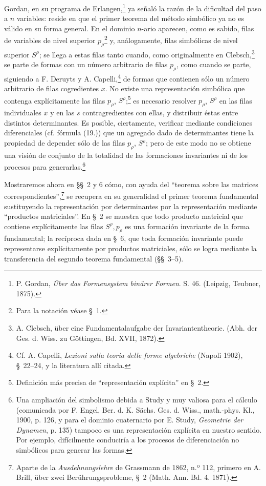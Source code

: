 \documentclass[11pt]{article}
\begin{document}
Gordan, en su programa de Erlangen,\footnote{P. Gordan, \emph{Über das Formensystem binärer Formen}. S. 46. (Leipzig, Teubner, 1875).} ya señaló la razón de la dificultad del paso a $n$ variables: reside en que el primer teorema del método simbólico ya no es válido en su forma general. En el dominio $n$-ario aparecen, como es sabido, filas de variables de nivel superior $p_\rho$\footnote{Para la notación véase \S\ 1.} y, análogamente, filas simbólicas de nivel superior $S^\rho$; se llega a estas filas tanto cuando, como originalmente en Clebsch,\footnote{A. Clebsch, über eine Fundamentalaufgabe der Invariantentheorie. (Abh. der Ges. d. Wiss. zu Göttingen, Bd. XVII, 1872).} se parte de formas con un número arbitrario de filas $p_\rho$, como cuando se parte, siguiendo a F. Deruyts y A. Capelli,\footnote{Cf. A. Capelli, \emph{Lezioni sulla teoria delle forme algebriche} (Napoli 1902), \S\ 22--24, y la literatura allí citada.} de formas que contienen sólo un número arbitrario de filas cogredientes $x$. No existe una representación simbólica que contenga explícitamente las filas $p_\rho$, $S^\rho$;\footnote{Definición más precisa de ``representación explícita'' en \S\ 2.} es necesario resolver $p_\rho$, $S^\rho$ en las filas individuales $x$ y en las $s$ contragredientes con ellas, y distribuir éstas entre distintos determinantes. Es posible, ciertamente, verificar mediante condiciones diferenciales (cf. fórmula (19.)) que un agregado dado de determinantes tiene la propiedad de depender sólo de las filas $p_\rho$, $S^\rho$; pero de este modo no se obtiene una visión de conjunto de la totalidad de las formaciones invariantes ni de los procesos para generarlas.\footnote{Una ampliación del simbolismo debida a Study y muy valiosa para el cálculo (comunicada por F. Engel, Ber. d. K. Sächs. Ges. d. Wiss., math.-phys. Kl., 1900, p. 126, y para el dominio cuaternario por E. Study, \emph{Geometrie der Dynamen}, p. 135) tampoco es una representación explícita en nuestro sentido. Por ejemplo, difícilmente conduciría a los procesos de diferenciación no simbólicos para generar las formas.}

Mostraremos ahora en \S\S\ 2 y 6 cómo, con ayuda del ``teorema sobre las matrices correspondientes'',\footnote{Aparte de la \emph{Ausdehnungslehre} de Grassmann de 1862, n.º 112, primero en A. Brill, über zwei Berührungsprobleme, \S\ 2 (Math. Ann. Bd. 4. 1871).} se recupera en su generalidad el primer teorema fundamental sustituyendo la representación por determinantes por la representación mediante ``productos matriciales''. En \S\ 2 se muestra que todo producto matricial que contiene explícitamente las filas $S^\rho,p_\rho$ es una formación invariante de la forma fundamental; la recíproca dada en \S\ 6, que toda formación invariante puede representarse explícitamente por productos matriciales, sólo se logra mediante la transferencia del segundo teorema fundamental (\S\S\ 3--5).
\end{document}
